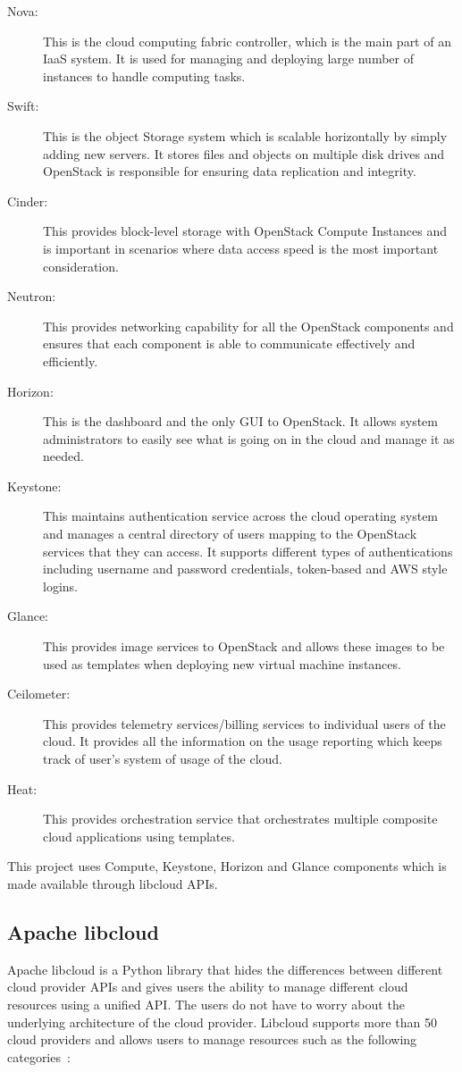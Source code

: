 \begin{description}
   \item[Nova:] This is the cloud computing fabric controller, which is the
   main part of an IaaS system. It is used for managing and deploying large
   number of instances to handle computing tasks. 
   \item[Swift:] This is the object Storage system which is scalable
   horizontally by simply adding new servers. It stores files and objects on
   multiple disk drives and OpenStack is responsible for ensuring data
   replication and integrity. 
   \item[Cinder:] This provides block-level storage with OpenStack Compute
   Instances and is important in scenarios where data access speed is the most
   important consideration. 
   \item[Neutron:] This provides networking capability for all the
   OpenStack components and ensures that each component is able to communicate
   effectively and efficiently. 
   \item[Horizon:] This is the dashboard and the only GUI to OpenStack. It
   allows system administrators to easily see what is going on in the cloud and
   manage it as needed.  
   \item[Keystone:] This maintains authentication service across the cloud
   operating system and manages a central directory of users mapping to the
   OpenStack services that they can access. It supports different types of
   authentications including username and password credentials, token-based and
   AWS style logins.
   \item[Glance:] This provides image services to OpenStack and allows
   these images to be used as templates when deploying new virtual machine
   instances. 
   \item[Ceilometer:] This provides telemetry services/billing services to
   individual users of the cloud. It provides all the information on the usage
   reporting which keeps track of user's system of usage of the cloud.
   \item[Heat:] This provides orchestration service that orchestrates
   multiple composite cloud applications using templates. 
\end{description}
	
This project uses Compute, Keystone, Horizon and Glance components which is 
made available through libcloud APIs. 

\subsection{Apache libcloud}
Apache libcloud is a Python library that hides the differences between 
different cloud provider APIs and gives users the ability to manage different 
cloud resources using a unified API. The users do not have to worry about the
underlying architecture of the cloud provider. Libcloud supports more than 50
cloud providers and allows users to manage resources such as the following
categories~\cite{hid-sp18-516-www-libcloud}:


